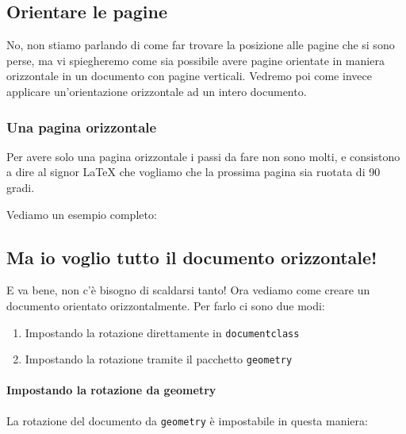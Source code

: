 \newpage
\begin{landscape}

\subsection{Orientare le pagine}

No, non stiamo parlando di come far trovare la posizione alle pagine che si
sono perse, ma vi spiegheremo come sia possibile avere pagine orientate in
maniera orizzontale in un documento con pagine verticali. Vedremo poi come
invece applicare un'orientazione orizzontale ad un intero documento.

\subsubsection{Una pagina orizzontale}

Per avere solo una pagina orizzontale i passi da fare non sono molti, e
consistono a dire al signor \LaTeX{} che vogliamo che la prossima pagina sia
ruotata di 90 gradi.

\vspace{\abovedisplayskip}
\begin{minipage}{\linewidth}
  \noindent Vediamo un esempio completo:
  
\end{minipage}
\vspace{\belowdisplayskip}

\subsection{Ma io voglio tutto il documento orizzontale!}

E va bene, non c'è bisogno di scaldarsi tanto! Ora vediamo come creare un
documento orientato orizzontalmente. Per farlo ci sono due modi:
\begin{enumerate}
 \item Impostando la rotazione direttamente in \texttt{documentclass}
 \item Impostando la rotazione tramite il pacchetto \texttt{geometry}
\end{enumerate}


\vspace{\abovedisplayskip}
\begin{minipage}{\linewidth}
  \paragraph*{Impostando la rotazione da geometry}

  La rotazione del documento da \texttt{geometry} è impostabile in questa
  maniera:
  


\end{minipage}
\vspace{\belowdisplayskip}

\end{landscape}
\newpage
